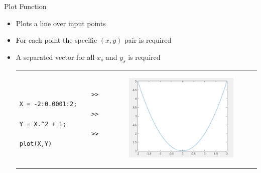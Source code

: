 \documentclass{beamer}
\begin{document}
\begin{frame}[fragile]{Plot Function}
	\begin{block}{}
		\begin{itemize}
			\item Plots a line over input points
			\item For each point the specific $(x,y)$ pair is required
			\item A separated vector for all $x_s$ and $y_s$ is required
			\vspace{10pt}
			\begin{tabular}{p{0.4\textwidth}p{}}
			\begin{minipage}{}
			\java
				\begin{lstlisting}
					>> X = -2:0.0001:2;
					>> Y = X.^2 + 1;
					>> plot(X,Y)
				\end{lstlisting}
			
			\end{minipage}
			&
			\begin{minipage}{0.4\textwidth}
			\begin{figure}[H]
				\centering
				\includegraphics[scale=0.25]{./Imgs/plot1.png}
			\end{figure}
			
			\end{minipage}
			\end{tabular}
		\end{itemize}
	\end{block}
\end{frame}
\end{document}
